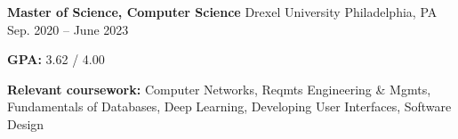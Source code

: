 

\begin{cventries}

  \cventry
  {\textbf{Master of Science, Computer Science}} %
  {Drexel University} %
  {Philadelphia, PA} %
  {Sep. 2020 -- June 2023} %
  {
    \begin{cvitems} %
      \item {\textbf{GPA:} 3.62 / 4.00}
      \item {\color{darktext} \textbf{Relevant coursework:}
                  Computer Networks,
                  Reqmts Engineering \& Mgmts,
                  Fundamentals of Databases,
                  Deep Learning,
                  Developing User Interfaces,
                  Software Design
            }
    \end{cvitems}} 
    

\end{cventries}
